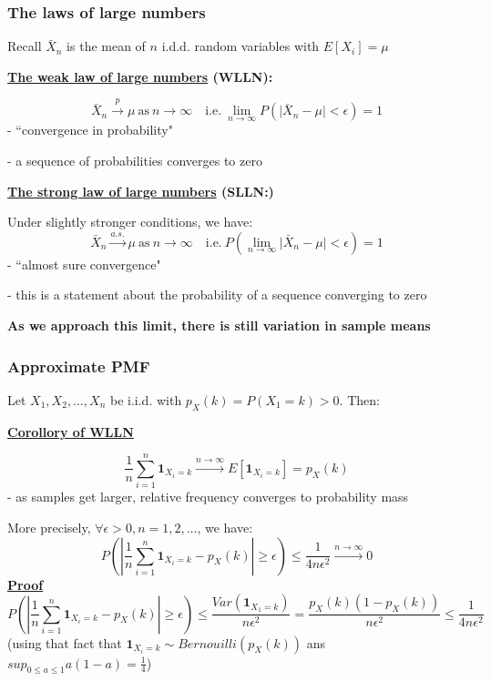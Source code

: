 \documentclass[t,8pt]{beamer}%
\begin{document}
\begin{frame}
	\frametitle{The laws of large numbers}
        Recall $\bar X_n$ is the mean of $n$ i.d.d. random variables with $E[X_i]=\mu$ \par
	{\bf\underline{The weak law of large numbers} (WLLN):} \par
	$$\bar X_n\xrightarrow{\text{$p$}}\mu\ \text{as}\ n\rightarrow\infty\quad\text{i.e.}\ \lim_{n\rightarrow\infty} P\left(\vert\bar X_n-\mu\vert<\epsilon\right)=1$$
    - ``convergence in probability" \par
    {\small\color{NavyBlue} - a sequence of probabilities converges to zero} \par
	{\bf\underline{The strong law of large numbers} (SLLN:)} \par
        Under slightly stronger conditions, we have:
	$$\bar X_n\xrightarrow{\text{$a.s.$}} \mu\ \text{as}\ n\rightarrow\infty\quad\text{i.e.}\ P\left(\lim_{n\rightarrow\infty} \vert\bar X_n-\mu\vert<\epsilon\right)=1$$
    - ``almost sure convergence" \par
    {\small\color{NavyBlue} - this is a statement about the probability of a sequence converging to zero} \par
    {\bf As we approach this limit, there is still variation in sample means}
\end{frame}

\begin{frame}
    \frametitle{Approximate PMF}
    Let $X_1,X_2,\dots,X_n$ be i.i.d. with $p_X(k)=P(X_1=k)>0$. Then: \par
    {\bf\underline{Corollory of WLLN}} \par
    $$\frac 1n\sum_{i=1}^n\mathbf 1_{X_i=k}\xrightarrow{n\rightarrow\infty} E[\mathbf 1_{X_i=k}]=p_X(k)$$
    {\small\color{NavyBlue} - as samples get larger, relative frequency converges to probability mass} \par
    More precisely, $\forall\epsilon>0,n=1,2,\dots$, we have:
    $$P\left(\left|\frac 1n\sum_{i=1}^n\mathbf 1_{X_i=k}-p_X(k)\right|\geq\epsilon\right)\leq\frac{1}{4n\epsilon^2}\xrightarrow{n\rightarrow\infty}0$$
    {\bf\underline{Proof}}
    $$P\left(\left|\frac 1n\sum_{i=1}^n\mathbf 1_{X_i=k}-p_X(k)\right|\geq\epsilon\right)\leq\frac{Var(\mathbf 1_{X_1=k})}{n\epsilon^2}=\frac{p_X(k)(1-p_X(k))}{n\epsilon^2}\leq\frac{1}{4n\epsilon^2}$$
    (using that fact that $\mathbf 1_{X_i=k}\sim Bernouilli(p_X(k))$ ans $sup_{0\leq a\leq 1}a(1-a)=\frac 14$)
\end{frame}
\end{document}

